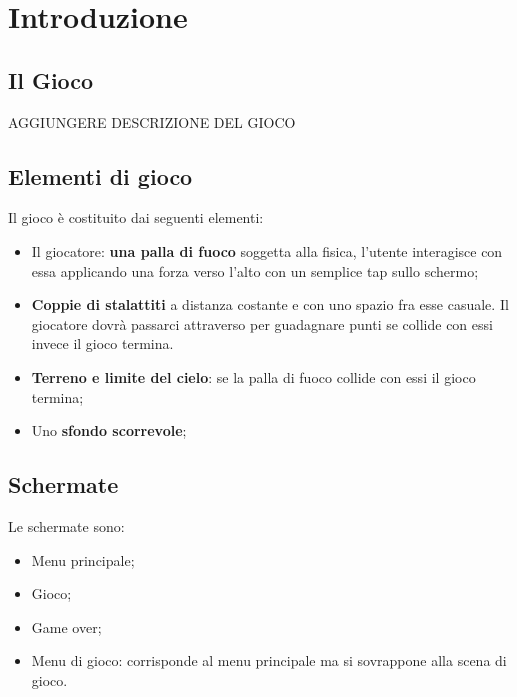 \section{Introduzione}

	\subsection{Il Gioco}
	
		AGGIUNGERE DESCRIZIONE DEL GIOCO
			
			
		\subsection{Elementi di gioco}
			Il gioco è costituito dai seguenti elementi:
			\begin{itemize}
				\item Il giocatore: \textbf{una palla di fuoco} soggetta alla fisica, l'utente interagisce con essa applicando una forza verso l'alto con un semplice tap sullo schermo;
				\item \textbf{Coppie di stalattiti} a distanza costante e con uno spazio fra esse casuale. Il giocatore dovrà passarci attraverso per guadagnare punti se collide con essi invece il gioco termina.
				\item \textbf{Terreno e limite del cielo}: se la palla di fuoco collide con essi il gioco termina;
				\item Uno \textbf{sfondo scorrevole};
			\end{itemize}
		
		\subsection{Schermate}
			Le schermate sono:
			\begin{itemize}
				\item Menu principale;
				\item Gioco;
				\item Game over;
				\item Menu di gioco: corrisponde al menu principale ma si sovrappone alla scena di gioco.
			\end{itemize}
		

